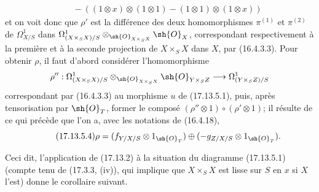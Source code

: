 \begin{env}[17.13.5]
\[\begin{split}
&\quad-((1\otimes x)\otimes(1\otimes1)-(1\otimes1)\otimes(1\otimes x))
\end{split}
\]
et on voit donc que $\rho'$ est la différence des deux homomorphismes $\pi^{(1)}$ et $\pi^{(2)}$ de $\Omega^1_{X/S}$ dans $\Omega^1_{(X\times_SX)/S}\otimes_{\sh{O}_{X\times_SX}}\sh{O}_X$, correspondant respectivement à la première et à la seconde projection de $X\times_SX$ dans $X$, par (16.4.3.3). Pour obtenir $\rho$, il faut d'abord considérer l'homomorphisme
\[
\rho'':\Omega^1_{(X\times_SX)/S}\otimes_{\sh{O}_{X\times_SX}}\sh{O}_{Y\times_SZ}\to\Omega^1_{(Y\times_SZ)/S}
\]
correspondant par (16.4.3.3) au morphisme $u$ de (17.13.5.1), puis, après tensorisation par $\sh{O}_T$, former le composé $(\rho''\otimes1)\circ(\rho'\otimes1)$; il résulte de ce qui précède que l'on a, avec les notations de (16.4.18),
\[
\label{IV.17.13.5.4}
\tag{17.13.5.4}
\rho=(f_{Y/X/S}\otimes1_{\sh{O}_T})\oplus(-g_{Z/X/S}\otimes1_{\sh{O}_T}).
\]


Ceci dit, l'application de (17.13.2) à la situation du diagramme (17.13.5.1) (compte tenu de (17.3.3, (iv)), qui implique que $X\times_SX$ est lisse sur $S$ en $x$ si $X$ l'est) donne le corollaire suivant.
\end{env}

